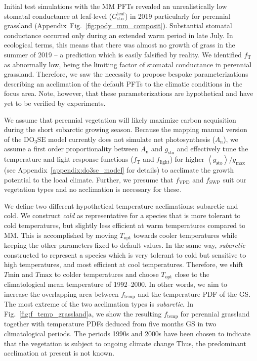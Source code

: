 \documentclass[bg, manuscript]{copernicus}
\begin{document}
Initial test simulations with the MM PFTs revealed an unrealistically low stomatal conductance at leaf-level ($G_\mathrm{sto}^\mathrm{leaf}$) in 2019 particularly for perennial grassland (Appendix~Fig.~\ref{fig:pody_mm_composit}). Substantial stomatal conductance occurred only during an extended warm period in late July. In ecological terms, this means that there was almost no growth of grass in the summer of 2019 -- a prediction which is easily falsified by reality. We identified $f_\mathrm{T}$ as abnormally low, being the limiting factor of stomatal conductance in perennial grassland. Therefore, we saw the necessity to propose bespoke parameterizations describing an acclimation of the default PFTs to the climatic conditions in the focus area. Note, however, that these parameterizations are hypothetical and have yet to be verified by experiments. 

We assume that perennial vegetation will likely maximize carbon acquisition during the short subarctic growing season. Because the mapping manual version of the $\mathrm{DO_3SE}$ model currently does not simulate net photosynthesis ($A_\mathrm{n}$), we assume a first order proportionality between $A_\mathrm{n}$ and $g_\mathrm{sto}$ \citep{GCB:Medlyn2011} and effectively tune the temperature and light response functions ($f_\mathrm{T}$ and $f_\mathrm{light}$) for higher $\left<g_\mathrm{sto}\right>/g_\mathrm{max}$ (see Appendix~\ref{appendix:do3se_model} for details) to acclimate the growth potential to the local climate. Further, we presume that $f_\mathrm{VPD}$ and $f_\mathrm{SWP}$ suit our vegetation types and no acclimation is necessary for these. 

We define two different hypothetical temperature acclimations: subarctic and cold. We construct \emph{cold} as representative for a species that is more tolerant to cold temperatures, but slightly less efficient at warm temperatures compared to MM. This is accomplished by moving $T_\mathrm{opt}$ towards cooler temperatures while keeping the other parameters fixed to default values. In the same way, \emph{subarctic} constructed to represent a species which is very tolerant to cold but sensitive to high temperatures, and most efficient at cool temperatures. Therefore, we shift $T\mathrm{min}$ and $T\mathrm{max}$ to colder temperatures and choose $T_\mathrm{opt}$ close to the climatological mean temperature of 1992--2000. In other words, we aim to increase the overlapping area between $f_\mathrm{temp}$ and the temperature PDF of the GS. The most extreme of the two acclimation types is \emph{subarctic}.
In Fig.~\ref{fig:f_temp_grassland}a, we show the resulting $f_\mathrm{temp}$ for perennial grassland together with temperature PDFs deduced from five months GS in two climatological periods. The periods 1990s and 2000s have been chosen to indicate that the vegetation is subject to ongoing climate change Thus, the predominant acclimation at present is not known.
\end{document}
